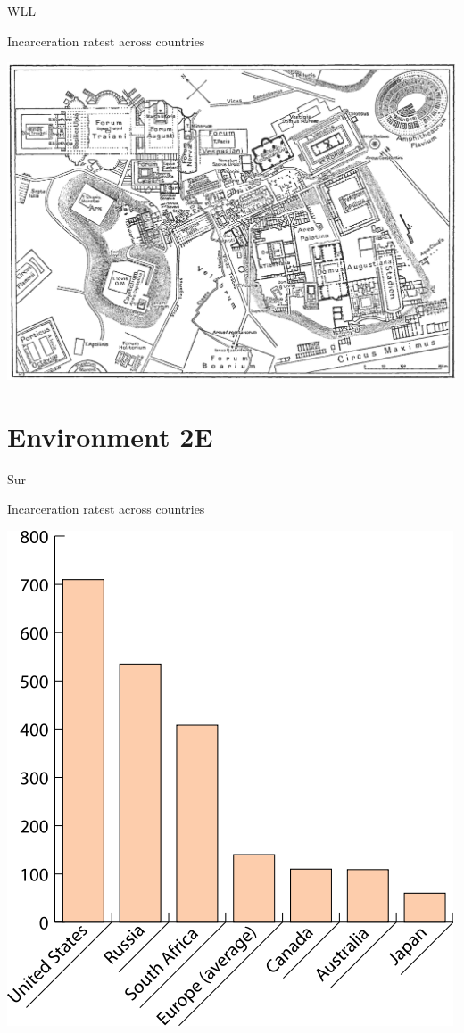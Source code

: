 \begin{map}{W}{LL}
\caption{Incarceration ratest across countries}
\label{chart:incarceration}
\includegraphics[width=\chartwidth,height=\chartheight]{Rome}  
\end{map}


\section{Environment 2E}

\lipsum[1-2]

\begin{chart}{S}{ur}
\caption{Incarceration ratest across countries}
\label{chart:incarceration}
\includegraphics[width=\chartwidth,height=\chartheight]{incarceration}  
\end{chart}

